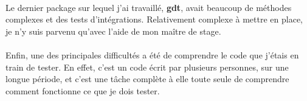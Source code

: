 \paragraph{}
Le dernier package sur lequel j'ai travaillé, \textbf{gdt}, avait beaucoup de méthodes complexes et des tests d'intégrations. Relativement complexe à mettre en place, je n'y suis parvenu qu'avec l'aide de mon maître de stage.

\paragraph{}
Enfin, une des principales difficultés a été de comprendre le code que j'étais en train de tester. En effet, c'est un code écrit par plusieurs personnes, sur une longue période, et c'est une tâche complète à elle toute seule de comprendre comment fonctionne ce que je dois tester.